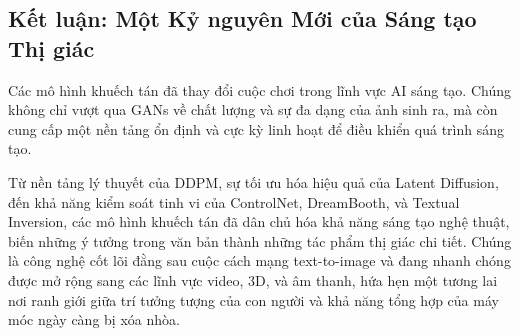 \subsection{Kết luận: Một Kỷ nguyên Mới của Sáng tạo Thị giác}
\label{subsec:diffusion_conclusion}
Các mô hình khuếch tán đã thay đổi cuộc chơi trong lĩnh vực AI sáng tạo. Chúng không chỉ vượt qua GANs về chất lượng và sự đa dạng của ảnh sinh ra, mà còn cung cấp một nền tảng ổn định và cực kỳ linh hoạt để điều khiển quá trình sáng tạo.

Từ nền tảng lý thuyết của DDPM, sự tối ưu hóa hiệu quả của Latent Diffusion, đến khả năng kiểm soát tinh vi của ControlNet, DreamBooth, và Textual Inversion, các mô hình khuếch tán đã dân chủ hóa khả năng sáng tạo nghệ thuật, biến những ý tưởng trong văn bản thành những tác phẩm thị giác chi tiết. Chúng là công nghệ cốt lõi đằng sau cuộc cách mạng text-to-image và đang nhanh chóng được mở rộng sang các lĩnh vực video, 3D, và âm thanh, hứa hẹn một tương lai nơi ranh giới giữa trí tưởng tượng của con người và khả năng tổng hợp của máy móc ngày càng bị xóa nhòa.

